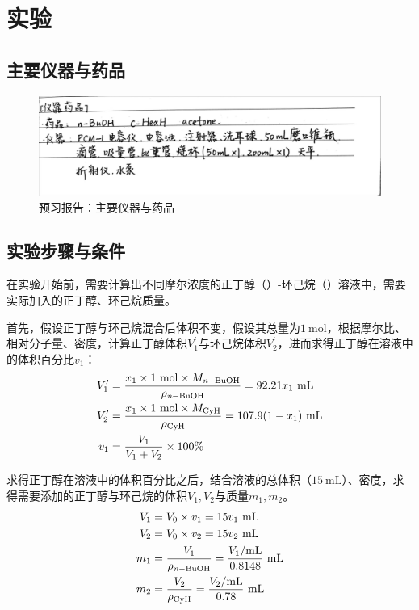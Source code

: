 \documentclass[cn,hazy,pku,12pt,normal,math=newtx,cite=super]{elegantnote}
\begin{document}
\newpage
\section{实验}

\subsection{主要仪器与药品}

\begin{figure}[htbp]
    \centering
    \includegraphics[width=.8\textwidth]{figures/0-2.jpg}
    \caption{预习报告：主要仪器与药品}
\end{figure}

\subsection{实验步骤与条件}

在实验开始前，需要计算出不同摩尔浓度的正丁醇（）-环己烷（）溶液中，需要实际加入的正丁醇、环己烷质量。

首先，假设正丁醇与环己烷混合后体积不变，假设其总量为$1\mathrm{~mol}$，根据摩尔比、相对分子量、密度，计算正丁醇体积$V_1^\prime$与环己烷体积$V_2^\prime$，进而求得正丁醇在溶液中的体积百分比$v_1$：
\begin{align*}
    V_1^\prime &= \frac{x_1 \times 1 \mathrm{~mol} \times M_{\ce{\textit{n}-BuOH}}}{\rho_{\ce{\textit{n}-BuOH}}} = 92.21x_1\mathrm{~mL}\\
    V_2^\prime &= \frac{x_1 \times 1 \mathrm{~mol} \times M_{\ce{CyH}}}{\rho_{\ce{CyH}}} = 107.9(1-x_1)\mathrm{~mL}\\
    v_1 &= \frac{V_1}{V_1+V_2}\times 100\%
\end{align*} 

求得正丁醇在溶液中的体积百分比之后，结合溶液的总体积（$15\mathrm{~mL}$）、密度，求得需要添加的正丁醇与环己烷的体积$V_1,V_2$与质量$m_1, m_2$。
\begin{align*}
    V_1 &= V_0 \times v_1 = 15v_1\mathrm{~mL}\\
    V_2 &= V_0 \times v_2 = 15v_2\mathrm{~mL}\\
    m_1 &= \frac{V_1}{\rho_{\ce{\textit{n}-BuOH}}} = \frac{V_1/\mathrm{mL}}{0.8148} \mathrm{~mL}\\
    m_2 &= \frac{V_2}{\rho_{\ce{CyH}}} = \frac{V_2/\mathrm{mL}}{0.78} \mathrm{~mL}
\end{align*}
\end{document}
